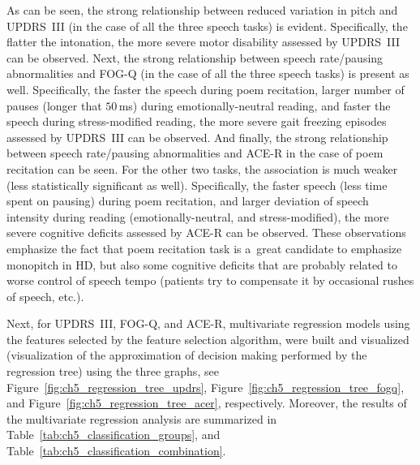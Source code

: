 As can be seen, the strong relationship between reduced variation in pitch and UPDRS~III (in the case of all the three speech tasks) is evident. Specifically, the flatter the intonation, the more severe motor disability assessed by UPDRS~III can be observed. Next, the strong relationship between speech rate/pausing abnormalities and FOG-Q (in the case of all the three speech tasks) is present as well. Specifically, the faster the speech during poem recitation, larger number of pauses (longer that $50$\,ms) during emotionally-neutral reading, and faster the speech during stress-modified reading, the more severe gait freezing episodes assessed by UPDRS~III can be observed. And finally, the strong relationship between speech rate/pausing abnormalities and ACE-R in the case of poem recitation can be seen. For the other two tasks, the association is much weaker (less statistically significant as well). Specifically, the faster speech (less time spent on pausing) during poem recitation, and larger deviation of speech intensity during reading (emotionally-neutral, and stress-modified), the more severe cognitive deficits assessed by ACE-R can be observed. These observations emphasize the fact that poem recitation task is a~great candidate to emphasize monopitch in HD, but also some cognitive deficits that are probably related to worse control of speech tempo (patients try to compensate it by occasional rushes of speech, etc.).

Next, for UPDRS~III, FOG-Q, and ACE-R, multivariate regression models using the features selected by the feature selection algorithm, were built and visualized (visualization of the approximation of decision making performed by the regression tree) using the three graphs, see Figure~\ref{fig:ch5_regression_tree_updrs}, Figure~\ref{fig:ch5_regression_tree_fogq}, and Figure~\ref{fig:ch5_regression_tree_acer}, respectively. Moreover, the results of the multivariate regression analysis are summarized in Table~\ref{tab:ch5_classification_groups}, and Table~\ref{tab:ch5_classification_combination}.

